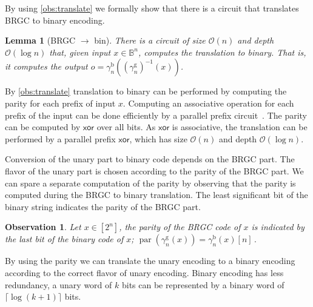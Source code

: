 \documentclass[9pt,journal,compsoc]{IEEEtran}
\newtheorem{lemma}[theorem]{Lemma}
\newtheorem{observation}[theorem]{Observation}
\theoremstyle{remark}
\DeclareMathOperator{\parity}{par}
\newcommand{\IB}{\mathbb{B}}
\newcommand{\XOR}{\textsf{xor}}
\newcommand{\ceil}[1]{\lceil{#1}\rceil}
\newcommand{\gBin}[1]{\gamma_{#1}^{\operatorname{b}}}
\newcommand{\gBRGC}[1]{\gamma_{#1}^{\operatorname{g}}}
\newcommand{\BO}{\mathcal{O}}
\begin{document}
By using \cref{obs:translate} we formally show that there is a 
circuit that translates BRGC to binary encoding.

\begin{lemma}[BRGC $\rightarrow$ bin]\label{lem:brgctobin}
  There is a circuit of size $\BO(n)$ and depth $\BO(\log n)$ that, given input $x\in\IB^n$,
    computes the translation to binary.
  That is, it computes the output
    $o = \gBin{n}((\gBRGC{n})^{-1}(x))$.
\end{lemma}
\begin{IEEEproof}
  By \cref{obs:translate} translation to binary can be performed 
    by computing the parity for each prefix of input $x$.
  Computing an associative operation for each prefix of the input can be done 
    efficiently by a parallel prefix circuit~\cite{ladner1980parallel}.
  The parity can be computed by $\XOR$ over all bits.
  As $\XOR$ is associative, the translation can be performed by a parallel prefix $\XOR$,
    which has size $\BO(n)$ and depth $\BO(\log n)$.
\end{IEEEproof}

Conversion of the unary part to binary code depends on the
  BRGC part.
The flavor of the unary part is chosen according to the parity of the
  BRGC part.
We can spare a separate computation of the parity by observing that
  the parity is computed during the BRGC to binary translation.
The least significant bit of the binary string indicates the parity
  of the BRGC part.

\begin{observation}\label{obs:paritybit}
  Let $x\in[2^n]$, the parity of the BRGC code of $x$ is indicated by the last bit of the
    binary code of $x$;
    $\parity(\gBRGC{n}(x)) = \gBin{n}(x)[n]\,.$
\end{observation}

By using the parity we can translate the unary encoding to a binary encoding
  according to the correct flavor of unary encoding.
Binary encoding has less redundancy, a unary word of $k$ bits can be 
  represented by a binary word of $\ceil{\log(k+1)}$
  bits.
\end{document}
